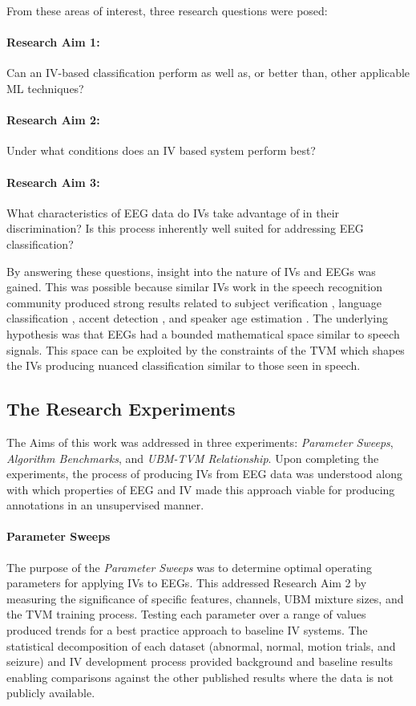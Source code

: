 From these areas of interest, three research questions were posed:

\paragraph*{Research Aim 1:} Can an \ac{IV}-based classification perform as well as, or better than, other applicable \ac{ML} techniques?
\paragraph*{Research Aim 2:} Under what conditions does an \ac{IV} based system perform best?
\paragraph*{Research Aim 3:} What characteristics of \ac{EEG} data do \acp{IV} take advantage of in their discrimination? Is this process inherently well suited for addressing \ac{EEG} classification?
\bigskip

By answering these questions, insight into the nature of \acp{IV} and \acp{EEG} was gained. This was possible because similar \acp{IV} work in the speech recognition community produced strong results related to subject verification \cite{Kenny2015}, language classification \cite{Li2013a}, accent detection \cite{Behravan2016}, and speaker age estimation \cite{Bahari2012}. The underlying hypothesis was that \acp{EEG} had a bounded mathematical space similar to speech signals. This space can be exploited by the constraints of the \ac{TVM} which shapes the \acp{IV} producing nuanced classification similar to those seen in speech.

\subsection{The Research Experiments}

The Aims of this work was addressed in three experiments: \emph{Parameter Sweeps}, \emph{Algorithm Benchmarks}, and \emph{\ac{UBM}-\ac{TVM} Relationship}. Upon completing the experiments, the process of producing \acp{IV} from \ac{EEG} data was understood along with which properties of \ac{EEG} and \ac{IV} made this approach viable for producing annotations in an unsupervised manner.

\paragraph*{Parameter Sweeps}
The purpose of the \emph{Parameter Sweeps} was to determine optimal operating parameters for applying \acp{IV} to \acp{EEG}. This addressed Research Aim 2 by measuring the significance of specific features, channels, \ac{UBM} mixture sizes, and the \ac{TVM} training process. Testing each parameter over a range of values produced trends for a best practice approach to baseline \ac{IV} systems. The statistical decomposition of each dataset (abnormal, normal, motion trials, and seizure) and \ac{IV} development process provided background and baseline results enabling comparisons against the other published results where the data is not publicly available.

